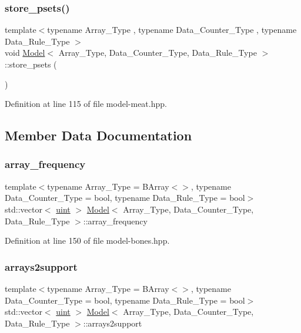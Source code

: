 \subsubsection{\texorpdfstring{store\+\_\+psets()}{store\_psets()}}
{\footnotesize\ttfamily template$<$typename Array\+\_\+\+Type , typename Data\+\_\+\+Counter\+\_\+\+Type , typename Data\+\_\+\+Rule\+\_\+\+Type $>$ \\
void \hyperlink{class_model}{Model}$<$ Array\+\_\+\+Type, Data\+\_\+\+Counter\+\_\+\+Type, Data\+\_\+\+Rule\+\_\+\+Type $>$\+::store\+\_\+psets (\begin{DoxyParamCaption}{ }\end{DoxyParamCaption})\hspace{0.3cm}{\ttfamily [inline]}}



Definition at line 115 of file model-\/meat.\+hpp.



\subsection{Member Data Documentation}
\mbox{\label{class_model_a8470b5bb905b692f24a3e5197f8680ed}} 
\subsubsection{\texorpdfstring{array\+\_\+frequency}{array\_frequency}}
{\footnotesize\ttfamily template$<$typename Array\+\_\+\+Type = B\+Array$<$$>$, typename Data\+\_\+\+Counter\+\_\+\+Type = bool, typename Data\+\_\+\+Rule\+\_\+\+Type = bool$>$ \\
std\+::vector$<$ \hyperlink{typedefs_8hpp_a91ad9478d81a7aaf2593e8d9c3d06a14}{uint} $>$ \hyperlink{class_model}{Model}$<$ Array\+\_\+\+Type, Data\+\_\+\+Counter\+\_\+\+Type, Data\+\_\+\+Rule\+\_\+\+Type $>$\+::array\+\_\+frequency}



Definition at line 150 of file model-\/bones.\+hpp.

\mbox{\label{class_model_a038858e9cd8e396412c3867113a149e7}} 
\subsubsection{\texorpdfstring{arrays2support}{arrays2support}}
{\footnotesize\ttfamily template$<$typename Array\+\_\+\+Type = B\+Array$<$$>$, typename Data\+\_\+\+Counter\+\_\+\+Type = bool, typename Data\+\_\+\+Rule\+\_\+\+Type = bool$>$ \\
std\+::vector$<$ \hyperlink{typedefs_8hpp_a91ad9478d81a7aaf2593e8d9c3d06a14}{uint} $>$ \hyperlink{class_model}{Model}$<$ Array\+\_\+\+Type, Data\+\_\+\+Counter\+\_\+\+Type, Data\+\_\+\+Rule\+\_\+\+Type $>$\+::arrays2support}



